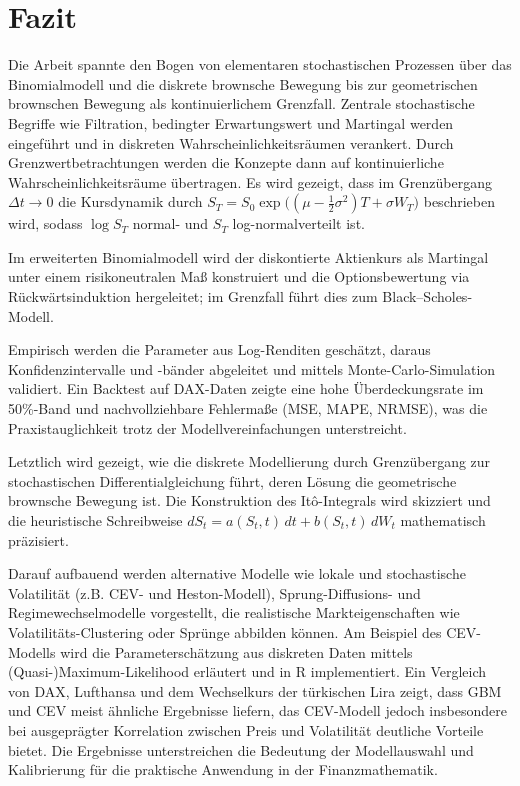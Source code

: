 \section{Fazit}

Die Arbeit spannte den Bogen von elementaren stochastischen Prozessen über das Binomialmodell und die diskrete brownsche 
Bewegung bis zur geometrischen brownschen Bewegung als kontinuierlichem Grenzfall. Zentrale stochastische Begriffe wie 
Filtration, bedingter Erwartungswert und Martingal werden eingeführt und in diskreten Wahrscheinlichkeitsräumen verankert. 
Durch Grenzwertbetrachtungen werden die Konzepte dann auf kontinuierliche Wahrscheinlichkeitsräume übertragen. Es wird gezeigt, dass im Grenzübergang $\Delta t \to 0$ die Kursdynamik durch
$S_T = S_0 \exp\!\big((\mu - \tfrac12\sigma^2)T + \sigma W_T\big)$
beschrieben wird, sodass $\log S_T$ normal- und $S_T$ log-normalverteilt ist. 

Im erweiterten Binomialmodell wird der diskontierte Aktienkurs als Martingal unter einem risikoneutralen Maß konstruiert und die Optionsbewertung 
via Rückwärtsinduktion hergeleitet; im Grenzfall führt dies zum Black–Scholes-Modell.

Empirisch werden die Parameter aus 
Log-Renditen geschätzt, daraus Konfidenzintervalle und -bänder abgeleitet und mittels Monte-Carlo-Simulation validiert. 
Ein Backtest auf DAX-Daten zeigte eine hohe Überdeckungsrate im 50\%-Band und nachvollziehbare Fehlermaße (MSE, MAPE, NRMSE), 
was die Praxistauglichkeit trotz der Modellvereinfachungen unterstreicht. 

Letztlich wird gezeigt, wie die diskrete Modellierung durch Grenzübergang zur stochastischen Differentialgleichung führt, deren Lösung die 
geometrische brownsche Bewegung ist. Die Konstruktion des Itô-Integrals wird skizziert und die 
heuristische Schreibweise $dS_t = a(S_t,t)\,dt + b(S_t,t)\,dW_t$ mathematisch präzisiert.

Darauf aufbauend werden alternative Modelle wie lokale und stochastische Volatilität (z.B. CEV- und Heston-Modell), Sprung-Diffusions- und Regimewechselmodelle vorgestellt, die realistische Markteigenschaften wie Volatilitäts-Clustering oder Sprünge abbilden können. 
Am Beispiel des CEV-Modells wird die Parameterschätzung aus diskreten Daten mittels (Quasi-)Maximum-Likelihood 
erläutert und in R implementiert. Ein Vergleich von DAX, Lufthansa und dem Wechselkurs der türkischen Lira zeigt, dass GBM und CEV meist ähnliche Ergebnisse liefern, das CEV-Modell jedoch insbesondere bei ausgeprägter Korrelation zwischen Preis und Volatilität deutliche Vorteile bietet. Die Ergebnisse unterstreichen die Bedeutung der
 Modellauswahl und Kalibrierung für die praktische Anwendung in der Finanzmathematik.


